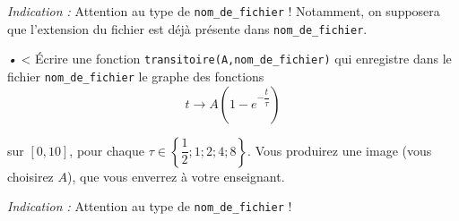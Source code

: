 \emph{Indication :} Attention au type de \texttt{nom\_de\_fichier} ! Notamment, on supposera que l'extension du fichier est déjà présente dans \texttt{nom\_de\_fichier}.

\medskip{}
\emph{•}
\question <{}%
 \'Ecrire une fonction \texttt{transitoire(A,nom\_de\_fichier)} qui enregistre dans le fichier \texttt{nom\_de\_fichier} le graphe des fonctions 
\begin{equation*}
  t \to A\left(1-e^{-\dfrac{t}{\tau}}\right)
\end{equation*}


sur $[0,10]$, pour chaque $\tau\in\left\{\dfrac{1}{2};1;2;4;8\right\}$. 
Vous produirez une image (vous choisirez $A$), que vous enverrez à votre enseignant. 

\emph{Indication :} Attention au type de \texttt{nom\_de\_fichier} !